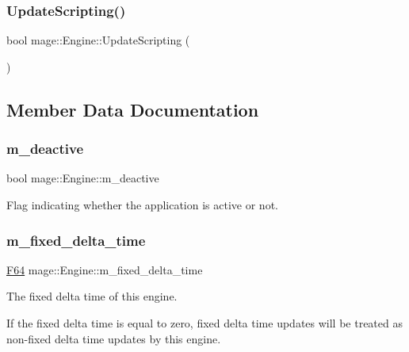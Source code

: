 \subsubsection{\texorpdfstring{Update\+Scripting()}{UpdateScripting()}}
{\footnotesize\ttfamily bool mage\+::\+Engine\+::\+Update\+Scripting (\begin{DoxyParamCaption}{ }\end{DoxyParamCaption})\hspace{0.3cm}{\ttfamily [private]}}



\subsection{Member Data Documentation}
\hypertarget{classmage_1_1_engine_ab8a4b0157403708ae7d1d018a95b4c63}{}\label{classmage_1_1_engine_ab8a4b0157403708ae7d1d018a95b4c63} 
\subsubsection{\texorpdfstring{m\+\_\+deactive}{m\_deactive}}
{\footnotesize\ttfamily bool mage\+::\+Engine\+::m\+\_\+deactive\hspace{0.3cm}{\ttfamily [private]}}

Flag indicating whether the application is active or not. \hypertarget{classmage_1_1_engine_a95557e1b6cba52b393c94d80d80bea4c}{}\label{classmage_1_1_engine_a95557e1b6cba52b393c94d80d80bea4c} 
\subsubsection{\texorpdfstring{m\+\_\+fixed\+\_\+delta\+\_\+time}{m\_fixed\_delta\_time}}
{\footnotesize\ttfamily \hyperlink{namespacemage_ad26233bbec640deda836e572c1a23708}{F64} mage\+::\+Engine\+::m\+\_\+fixed\+\_\+delta\+\_\+time\hspace{0.3cm}{\ttfamily [private]}}

The fixed delta time of this engine.

If the fixed delta time is equal to zero, fixed delta time updates will be treated as non-\/fixed delta time updates by this engine. \hypertarget{classmage_1_1_engine_ad46dd72279d9d86b96d1b907575765e9}{}\label{classmage_1_1_engine_ad46dd72279d9d86b96d1b907575765e9} 
